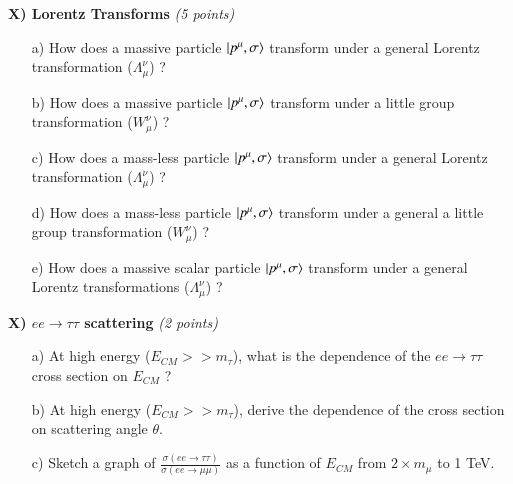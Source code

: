 {\textbf{X) Lorentz Transforms } \hfill \textit{(5 points)}\\
\begin{itemize}
\item[a)] How does a massive particle $\ket{p^\mu,\sigma}$ transform under a general Lorentz transformation ($\Lambda_\mu^\nu$)  ?
\item[b)] How does a massive particle $\ket{p^\mu,\sigma}$ transform under a little group transformation ($W_\mu^\nu$)  ?
\item[c)] How does a mass-less particle $\ket{p^\mu,\sigma}$ transform under a general Lorentz transformation ($\Lambda_\mu^\nu$)  ?
\item[d)] How does a mass-less particle $\ket{p^\mu,\sigma}$ transform under a general a little group transformation ($W_\mu^\nu$)  ?
\item[e)] How does a massive scalar particle $\ket{p^\mu,\sigma}$ transform under a general Lorentz transformations ($\Lambda_\mu^\nu$) ?
\end{itemize}








\textbf{X) $ee\rightarrow\tau\tau$ scattering } \hfill \textit{(2 points)}\\
\begin{itemize}
\item[a)]{
At high energy ($E_{CM} >> m_\tau$), what is the dependence of the $ee\rightarrow\tau\tau$ cross section on $E_{CM}$ ?
}

\item[b)]{
At high energy ($E_{CM} >> m_\tau$), derive the dependence of the cross section on scattering angle $\theta$.
}

\item[c)]{
Sketch a graph of $\frac{\sigma(ee\rightarrow\tau\tau)}{\sigma(ee\rightarrow\mu\mu)}$ as a function of $E_{CM}$ from $2\times m_{\mu}$ to 1 TeV.
}
\end{itemize}





}

